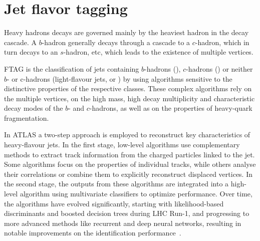 















\section{Jet flavor tagging}

Heavy hadrons decays are governed mainly by the heaviest hadron in the decay cascade. A \(b\)-hadron generally decays through a cascade to a \(c\)-hadron, which in turn decays to an \(s\)-hadron, etc, which leads to the existence of multiple vertices.

\ac{FTAG} is the classification of jets containing \(b\)-hadrons (\bjets), \(c\)-hadrons (\cjets) or neither \(b\)-
or c-hadrons (light-flavour jets, or \ljets) by using algorithms sensitive to the distinctive properties of the respective classes.
These complex algorithms rely on the multiple vertices, on the high mass, high decay multiplicity and characteristic decay modes of the \(b\)- and \(c\)-hadrons, as well as on the properties of heavy-quark fragmentation.


In \ac{ATLAS} a two-step approach is employed to reconstruct key characteristics of heavy-flavour jets. In the first stage, low-level algorithms use complementary methods to extract track information from the charged particles linked to the jet. Some algorithms focus on the properties of individual tracks, while others analyse their correlations or combine them to explicitly reconstruct displaced vertices. In the second stage, the outputs from these algorithms are integrated into a high-level algorithm using multivariate classifiers to optimize performance. Over time, the algorithms have evolved significantly, starting with likelihood-based discriminants and boosted decision trees during \ac{LHC} Run-1, and progressing to more advanced methods like recurrent and deep neural networks, resulting in notable improvements on the identification performance~\cite{ATLASFTAGCalibration2012,ATLASFTAGEfficiency2012,MV2Algorithm,ATLASFTAGDeepLearning}.

